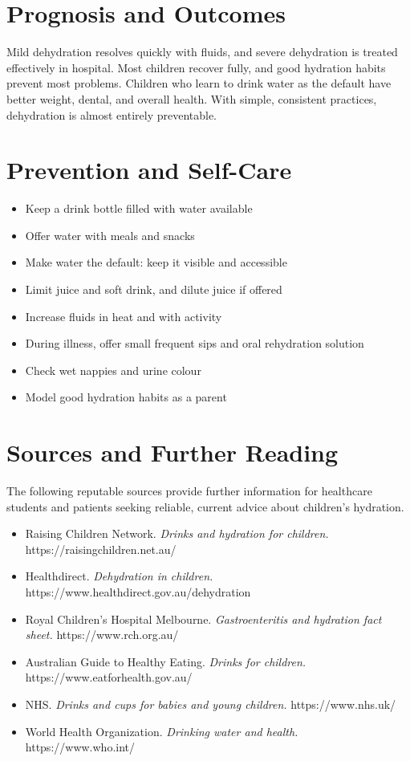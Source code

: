 \section*{Prognosis and Outcomes}
Mild dehydration resolves quickly with fluids, and severe dehydration is treated effectively in hospital. Most children recover fully, and good hydration habits prevent most problems. Children who learn to drink water as the default have better weight, dental, and overall health. With simple, consistent practices, dehydration is almost entirely preventable.

\section*{Prevention and Self-Care}
\begin{itemize}
    \item Keep a drink bottle filled with water available
    \item Offer water with meals and snacks
    \item Make water the default: keep it visible and accessible
    \item Limit juice and soft drink, and dilute juice if offered
    \item Increase fluids in heat and with activity
    \item During illness, offer small frequent sips and oral rehydration solution
    \item Check wet nappies and urine colour
    \item Model good hydration habits as a parent
\end{itemize}

\section*{Sources and Further Reading}
The following reputable sources provide further information for healthcare students and patients seeking reliable, current advice about children's hydration.

\begin{itemize}
    \item Raising Children Network. \textit{Drinks and hydration for children.} https://raisingchildren.net.au/
    \item Healthdirect. \textit{Dehydration in children.} https://www.healthdirect.gov.au/dehydration
    \item Royal Children's Hospital Melbourne. \textit{Gastroenteritis and hydration fact sheet.} https://www.rch.org.au/
    \item Australian Guide to Healthy Eating. \textit{Drinks for children.} https://www.eatforhealth.gov.au/
    \item NHS. \textit{Drinks and cups for babies and young children.} https://www.nhs.uk/
    \item World Health Organization. \textit{Drinking water and health.} https://www.who.int/
\end{itemize}
